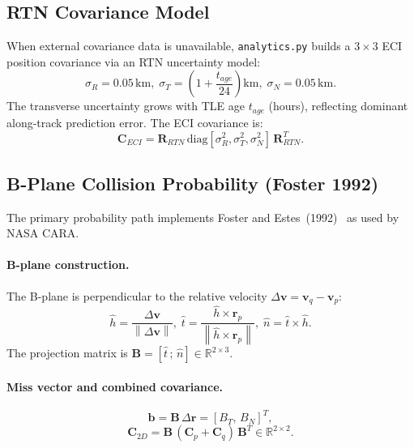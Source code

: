 \documentclass[conference]{IEEEtran}
\newcommand{\norm}[1]{\left\|#1\right\|}
\newcommand{\bvec}[1]{\mathbf{#1}}
\begin{document}
\subsection{RTN Covariance Model}

When external covariance data is unavailable, \texttt{analytics.py} builds a
$3\times3$ ECI position covariance via an RTN uncertainty model:
%
\begin{equation}
  \sigma_R = 0.05\,\text{km},\;
  \sigma_T = \!\left(1 + \frac{t_{age}}{24}\right)\!\text{km},\;
  \sigma_N = 0.05\,\text{km}.
\label{eq:rtn}
\end{equation}
%
The transverse uncertainty grows with TLE age $t_{age}$ (hours), reflecting
dominant along-track prediction error. The ECI covariance is:
%
\begin{equation}
  \bvec{C}_{ECI} = \bvec{R}_{RTN}\,
    \mathrm{diag}[\sigma_R^2, \sigma_T^2, \sigma_N^2]\,
    \bvec{R}_{RTN}^T.
\end{equation}

\subsection{B-Plane Collision Probability (Foster 1992)}
\label{ssec:foster}

The primary probability path implements Foster and Estes~(1992)~\cite{foster1992}
as used by NASA CARA.

\paragraph{B-plane construction.}
The B-plane is perpendicular to the relative velocity
$\Delta\bvec{v} = \bvec{v}_q - \bvec{v}_p$:
%
\begin{equation}
  \hat{h} = \frac{\Delta\bvec{v}}{\norm{\Delta\bvec{v}}},\;
  \hat{t} = \frac{\hat{h}\times\bvec{r}_p}{\norm{\hat{h}\times\bvec{r}_p}},\;
  \hat{n} = \hat{t}\times\hat{h}.
\end{equation}
%
The projection matrix is
$\bvec{B} = [\hat{t}\,;\,\hat{n}]\in\mathbb{R}^{2\times3}$.

\paragraph{Miss vector and combined covariance.}
\begin{equation}
  \bvec{b} = \bvec{B}\,\Delta\bvec{r} = [B_T,\, B_N]^T,
\end{equation}
\begin{equation}
  \bvec{C}_{2D} = \bvec{B}\,(\bvec{C}_p + \bvec{C}_q)\,\bvec{B}^T
    \in\mathbb{R}^{2\times2}.
\end{equation}
\end{document}
